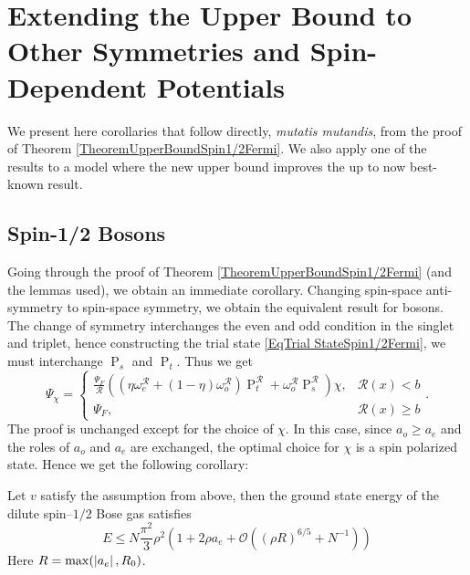 \section{Extending the Upper Bound to Other Symmetries and Spin-Dependent Potentials}
\label{SectionExtendingTheUpperBoundOtherSymmetries}
We present here corollaries that follow directly, \emph{mutatis mutandis}, from the proof of Theorem \ref{TheoremUpperBoundSpin1/2Fermi}. We also apply one of the results to a model where the new upper bound improves the up to now best-known result.
\subsection{Spin-1/2 Bosons}
Going through the proof of Theorem \ref{TheoremUpperBoundSpin1/2Fermi} (and the lemmas used), we obtain an immediate corollary. Changing spin-space anti-symmetry to spin-space symmetry, we obtain the equivalent result for bosons. The change of symmetry interchanges the even and odd condition in the singlet and triplet, hence constructing the trial state \eqref{EqTrial StateSpin1/2Fermi}, we must interchange $ \operatorname{P}_s $ and $ \operatorname{P}_t $. Thus we get \begin{equation}\label{EqTrial StateSpin1/2Bose}
\Psi_\chi=\begin{cases}
\frac{\Psi_F}{\mathcal{R}}\left(\left(\eta\omega^{\mathcal{R}}_e+(1-\eta)\omega^{\mathcal{R}}_o\right)\operatorname{P}_t^{\mathcal{R}}+\omega_o^{\mathcal{R}}\operatorname{P}_s^{\mathcal{R}}\right)\chi,&\mathcal{R}(x)<b\\
\Psi_F,&\mathcal{R}(x)\geq b
\end{cases}.
\end{equation}
The proof is unchanged except for the choice of $ \chi $. In this case, since $ a_o\geq a_e $ and the roles of $ a_o $ and $ a_e $ are exchanged, the optimal choice for $ \chi $ is a spin polarized state. Hence we get the following corollary:
\begin{corollary}\label{CorollaryUpperBoundSpin1/2Bose}
	Let $ v $ satisfy the assumption from above, then the ground state energy of the dilute spin--$ 1/2 $ Bose gas satisfies\begin{equation}
		E\leq N\frac{\pi^2}{3}\rho^2\left(1+2\rho a_e+\mathcal{O}\left((\rho R)^{6/5}+N^{-1}\right)\right)
	\end{equation}
	Here $ R=\max(\left\lvert a_e \right\rvert, R_0) $.
\end{corollary}


